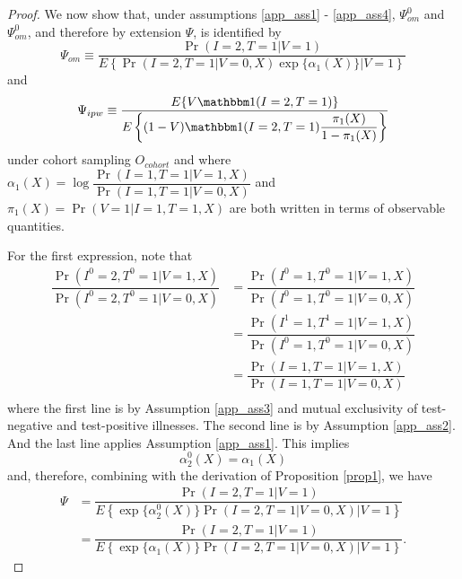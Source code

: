 \begin{appendix}
\begin{proof}
    We now show that, under assumptions \ref{app_ass1} - \ref{app_ass4}, $\Psi^0_{om}$ and $\Psi^0_{om}$, and therefore by extension $\Psi$, is identified by 
    \begin{equation}
        \Psi_{om} \equiv \dfrac{\Pr(I = 2, T = 1 | V = 1)}{E\left\{\Pr(I = 2, T = 1 | V = 0, X) \exp\{\alpha_1(X)\} \Big| V = 1 \right\}}
    \end{equation}
    and 
    \begin{equation}
        \Psi_{ipw} \equiv \dfrac{E\{V \mathbbm 1 (I = 2, T = 1)\}}{E\left\{ (1 - V) \mathbbm 1(I = 2, T = 1) \dfrac{\pi_1(X)}{1 - \pi_1(X)}\right\}}
    \end{equation}
    under cohort sampling $O_{cohort}$ and where $\alpha_1(X) = \log \dfrac{\Pr(I = 1, T = 1 | V = 1, X)}{\Pr(I = 1, T = 1 | V = 0, X)}$ and $\pi_1(X) = \Pr(V = 1| I = 1, T = 1, X)$ are both written in terms of observable quantities.
    
    For the first expression, note that 
    \begin{align*}
        \dfrac{\Pr(I^0 = 2, T^0=1 | V = 1, X)}{\Pr(I^0 = 2, T^0=1 | V = 0, X)} &= \dfrac{\Pr(I^0 = 1, T^0=1 | V = 1, X)}{\Pr(I^0 = 1, T^0=1 | V = 0, X)} \\
        &= \dfrac{\Pr(I^1 = 1, T^1=1 | V = 1, X)}{\Pr(I^0 = 1, T^0=1 | V = 0, X)} \\
        &= \dfrac{\Pr(I = 1, T = 1 | V = 1, X)}{\Pr(I = 1, T = 1 | V = 0, X)} \\
    \end{align*}
    where the first line is by Assumption \ref{app_ass3} and mutual exclusivity of test-negative and test-positive illnesses. The second line is by Assumption \ref{app_ass2}. And the last line applies Assumption \ref{app_ass1}. This implies
    \begin{equation*}
        \alpha_2^0(X) = \alpha_1(X)
    \end{equation*}
    and, therefore, combining with the derivation of Proposition \ref{prop1}, we have
    \begin{align*}
        \Psi &= \dfrac{\Pr(I = 2, T = 1 | V = 1)}{E\left\{ \exp\{\alpha^0_2(X)\} \Pr(I = 2, T = 1 | V = 0, X) \Big| V = 1 \right\}} \\
        &= \dfrac{\Pr(I = 2, T = 1 | V = 1)}{E\left\{ \exp\{\alpha_1(X)\} \Pr(I = 2, T = 1 | V = 0, X) \Big| V = 1 \right\}}.
    \end{align*}
    

\end{proof}
\end{appendix}
